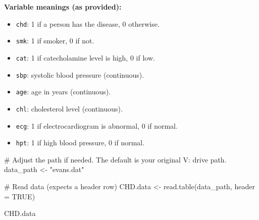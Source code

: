 \documentclass[
  letterpaper,
]{scrbook}
\newenvironment{Shaded}{\begin{snugshade}}{\end{snugshade}}
\newcommand{\AttributeTok}[1]{\textcolor[rgb]{0.40,0.45,0.13}{#1}}
\newcommand{\CommentTok}[1]{\textcolor[rgb]{0.37,0.37,0.37}{#1}}
\newcommand{\ConstantTok}[1]{\textcolor[rgb]{0.56,0.35,0.01}{#1}}
\newcommand{\FunctionTok}[1]{\textcolor[rgb]{0.28,0.35,0.67}{#1}}
\newcommand{\NormalTok}[1]{\textcolor[rgb]{0.00,0.23,0.31}{#1}}
\newcommand{\OtherTok}[1]{\textcolor[rgb]{0.00,0.23,0.31}{#1}}
\newcommand{\StringTok}[1]{\textcolor[rgb]{0.13,0.47,0.30}{#1}}
\providecommand{\tightlist}{%
  \setlength{\itemsep}{0pt}\setlength{\parskip}{0pt}}\usepackage{longtable,booktabs,array}
\begin{document}
\textbf{Variable meanings (as provided):}

\begin{itemize}
\tightlist
\item
  \texttt{chd}: 1 if a person has the disease, 0 otherwise.
\item
  \texttt{smk}: 1 if smoker, 0 if not.
\item
  \texttt{cat}: 1 if catecholamine level is high, 0 if low.
\item
  \texttt{sbp}: systolic blood pressure (continuous).
\item
  \texttt{age}: age in years (continuous).
\item
  \texttt{chl}: cholesterol level (continuous).
\item
  \texttt{ecg}: 1 if electrocardiogram is abnormal, 0 if normal.
\item
  \texttt{hpt}: 1 if high blood pressure, 0 if normal.
\end{itemize}

\begin{Shaded}
\begin{Highlighting}[]
\CommentTok{\# Adjust the path if needed. The default is your original V: drive path.}
\NormalTok{data\_path }\OtherTok{\textless{}{-}} \StringTok{"evans.dat"}

\CommentTok{\# Read data (expects a header row)}
\NormalTok{CHD.data }\OtherTok{\textless{}{-}} \FunctionTok{read.table}\NormalTok{(data\_path, }\AttributeTok{header =} \ConstantTok{TRUE}\NormalTok{)}

\NormalTok{CHD.data}
\end{Highlighting}
\end{Shaded}
\end{document}
